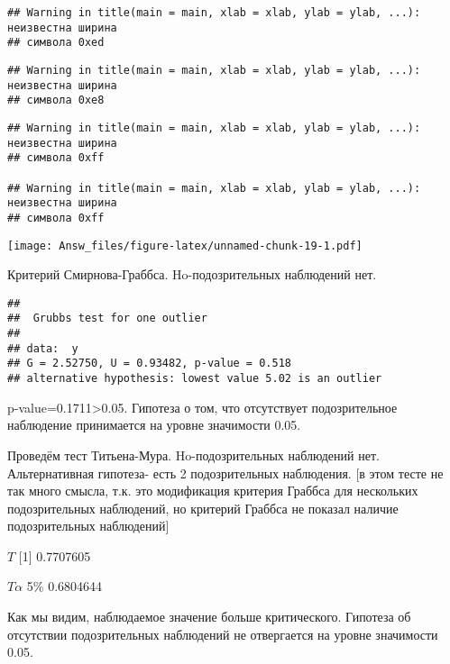 \documentclass[,]{article}
\begin{document}
\begin{verbatim}
## Warning in title(main = main, xlab = xlab, ylab = ylab, ...): неизвестна ширина
## символа 0xed
\end{verbatim}

\begin{verbatim}
## Warning in title(main = main, xlab = xlab, ylab = ylab, ...): неизвестна ширина
## символа 0xe8
\end{verbatim}

\begin{verbatim}
## Warning in title(main = main, xlab = xlab, ylab = ylab, ...): неизвестна ширина
## символа 0xff

## Warning in title(main = main, xlab = xlab, ylab = ylab, ...): неизвестна ширина
## символа 0xff
\end{verbatim}

\texttt{[image: Answ\_files/figure-latex/unnamed-chunk-19-1.pdf]}

Критерий Смирнова-Граббса. Ho-подозрительных наблюдений нет.

\begin{verbatim}
## 
##  Grubbs test for one outlier
## 
## data:  y
## G = 2.52750, U = 0.93482, p-value = 0.518
## alternative hypothesis: lowest value 5.02 is an outlier
\end{verbatim}

p-value=0.1711\textgreater{}0.05. Гипотеза о том, что отсутствует
подозрительное наблюдение принимается на уровне значимости 0.05.

Проведём тест Титьена-Мура. Ho-подозрительных наблюдений нет.
Альтернативная гипотеза- есть 2 подозрительных наблюдения. {[}в этом
тесте не так много смысла, т.к. это модификация критерия Граббса для
нескольких подозрительных наблюдений, но критерий Граббса не показал
наличие подозрительных наблюдений{]}

\(T\) {[}1{]} 0.7707605

\(T\alpha\) 5\% 0.6804644

Как мы видим, наблюдаемое значение больше критического. Гипотеза об
отсутствии подозрительных наблюдений не отвергается на уровне значимости
0.05.
\end{document}

